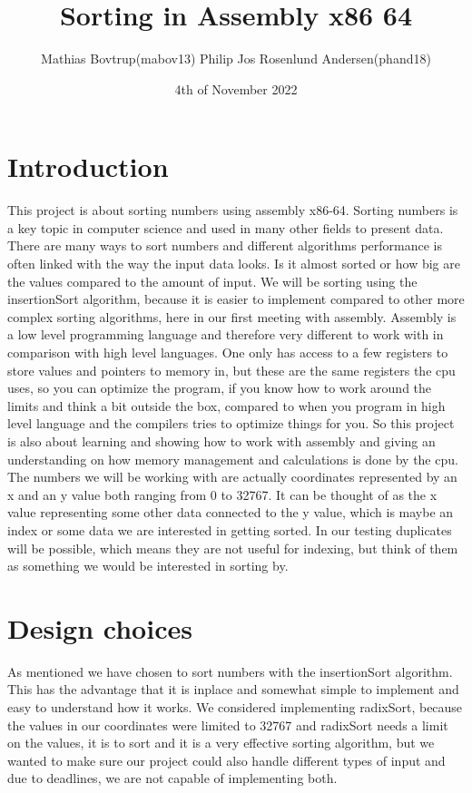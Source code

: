 \documentclass{article}
\title{Sorting in Assembly x86 64}
\author{Mathias Bovtrup(mabov13) Philip Jos Rosenlund Andersen(phand18)}
\date{4th of November 2022}
\begin{document}
\maketitle


\tableofcontents
\newpage

\section{Introduction}
This project is about sorting numbers using assembly x86-64. Sorting numbers is a key topic in computer science and used in many other fields to present data. There are many ways to sort numbers and different algorithms performance is often linked with the way the input data looks. Is it almost sorted or how big are the values compared to the amount of input. We will be sorting using the insertionSort algorithm, because it is easier to implement compared to other more complex sorting algorithms, here in our first meeting with assembly. Assembly is a low level programming language and therefore very different to work with in comparison with high level languages. One only has access to a few registers to store values and pointers to memory in, but these are the same registers the cpu uses, so you can optimize the program, if you know how to work around the limits and think a bit outside the box, compared to when you program in high level language and the compilers tries to optimize things for you. So this project is also about learning and showing how to work with assembly and giving an understanding on how memory management and calculations is done by the cpu. The numbers we will be working with are actually coordinates represented by an x and an y value both ranging from 0 to 32767. It can be thought of as the x value representing some other data connected to the y value, which is maybe an index or some data we are interested in getting sorted. In our testing duplicates will be possible, which means they are not useful for indexing, but think of them as something we would be interested in sorting by.

\section{Design choices}
As mentioned we have chosen to sort numbers with the insertionSort algorithm. This has the advantage that it is inplace and somewhat simple to implement and easy to understand how it works. We considered implementing radixSort, because the values in our coordinates were limited to 32767 and radixSort needs a limit on the values, it is to sort and it is a very effective sorting algorithm, but we wanted to make sure our project could also handle different types of input and due to deadlines, we are not capable of implementing both.
\end{document}
